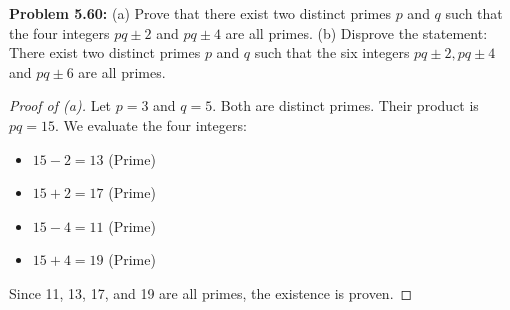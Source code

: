 \documentclass[11pt, a4paper]{article}
\theoremstyle{definition}
\theoremstyle{remark}
\begin{document}
\textbf{Problem 5.60:} 
(a) Prove that there exist two distinct primes $p$ and $q$ such that the four integers $pq \pm 2$ and $pq \pm 4$ are all primes.
(b) Disprove the statement: There exist two distinct primes $p$ and $q$ such that the six integers $pq \pm 2, pq \pm 4$ and $pq \pm 6$ are all primes.
\begin{proof}[Proof of (a)]
    Let $p = 3$ and $q = 5$. Both are distinct primes. Their product is $pq = 15$.
    We evaluate the four integers:
    \begin{itemize}
        \item $15 - 2 = 13$ (Prime)
        \item $15 + 2 = 17$ (Prime)
        \item $15 - 4 = 11$ (Prime)
        \item $15 + 4 = 19$ (Prime)
    \end{itemize}
    Since 11, 13, 17, and 19 are all primes, the existence is proven.
\end{proof}
\end{document}
